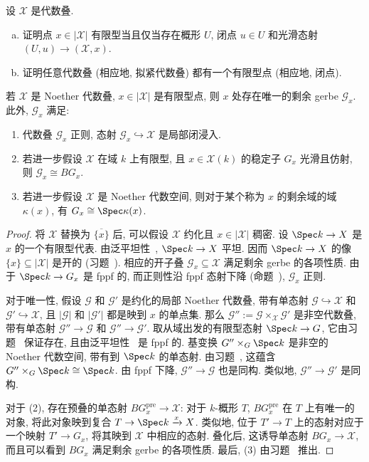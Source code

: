 \begin{exercise}\label{src:4.5.15}
设 $\mathcal X$ 是代数叠.
\begin{enumerate}[(a)]
\item 证明点 $x\in|\mathcal X|$ 有限型当且仅当存在概形 $U$, 闭点 $u\in U$ 和光滑态射 $(U,u)\to(\mathcal X,x)$.
\item 证明任意代数叠 (相应地, 拟紧代数叠) 都有一个有限型点 (相应地, 闭点).
\end{enumerate}
\end{exercise}
\begin{proposition}\label{src:4.5.16}
若 $\mathcal X$ 是 Noether 代数叠, $x\in|\mathcal X|$ 是有限型点, 则 $x$ 处存在唯一的剩余 gerbe $\mathcal G_x$. 此外, $\mathcal G_x$ 满足:
\begin{enumerate}[(1)]
\item 代数叠 $\mathcal G_x$ 正则, 态射 $\mathcal G_x\hookrightarrow\mathcal X$ 是局部闭浸入.
\item 若进一步假设 $\mathcal X$ 在域 $k$ 上有限型, 且 $x\in\mathcal X(k)$ 的稳定子 $G_x$ 光滑且仿射, 则 $\mathcal G_x\cong BG_x$.
\item 若进一步假设 $\mathcal X$ 是 Noether 代数空间, 则对于某个称为 $x$ 的剩余域的域 $\kappa(x)$, 有 $\mathcal G_x\cong\Spec\kappa(x)$.
\end{enumerate}
\end{proposition}
\begin{proof}
将 $\mathcal X$ 替换为 $\overline{\{x\}}$ 后, 可以假设 $\mathcal X$ 约化且 $x\in|\mathcal X|$ 稠密. 设 $\Spec k\to\mathcal X$ 是 $x$ 的一个有限型代表. 由泛平坦性~, $\Spec k\to\mathcal X$ 平坦. 因而 $\Spec k\to\mathcal X$ 的像 $\{x\}\subseteq|\mathcal X|$ 是开的 (习题~). 相应的开子叠 $\mathcal G_x\subseteq\mathcal X$ 满足剩余 gerbe 的各项性质. 由于 $\Spec k\to\mathcal G_x$ 是 fppf 的, 而正则性沿 fppf 态射下降 (命题~), $\mathcal G_x$ 正则.

对于唯一性, 假设 $\mathcal G$ 和 $\mathcal G'$ 是约化的局部 Noether 代数叠, 带有单态射 $\mathcal G\hookrightarrow\mathcal X$ 和 $\mathcal G'\hookrightarrow\mathcal X$, 且 $|\mathcal G|$ 和 $|\mathcal G'|$ 都是映到 $x$ 的单点集. 那么 $\mathcal G'':=\mathcal G\times_{\mathcal X}\mathcal G'$ 是非空代数叠, 带有单态射 $\mathcal G''\to\mathcal G$ 和 $\mathcal G''\to\mathcal G'$. 取从域出发的有限型态射 $\Spec k\to\mathcal G$, 它由习题~ 保证存在, 且由泛平坦性~ 是 fppf 的. 基变换 $\mathcal G''\times_{\mathcal G}\Spec k$ 是非空的 Noether 代数空间, 带有到 $\Spec k$ 的单态射. 由习题~, 这蕴含 $\mathcal G''\times_{\mathcal G}\Spec k\cong\Spec k$. 由 fppf 下降, $\mathcal G''\to\mathcal G$ 也是同构. 类似地, $\mathcal G''\to\mathcal G'$ 是同构.

对于 (2), 存在预叠的单态射 $BG_x^{\mathrm{pre}}\to\mathcal X$: 对于 $k$-概形 $T$, $BG_x^{\mathrm{pre}}$ 在 $T$ 上有唯一的对象, 将此对象映到复合 $T\to\Spec k\xrightarrow{x}\mathcal X$. 类似地, 位于 $T'\to T$ 上的态射对应于一个映射 $T'\to G_x$, 将其映到 $\mathcal X$ 中相应的态射. 叠化后, 这诱导单态射 $BG_x\to\mathcal X$, 而且可以看到 $BG_x$ 满足剩余 gerbe 的各项性质. 最后, (3) 由习题~ 推出.
\end{proof}
